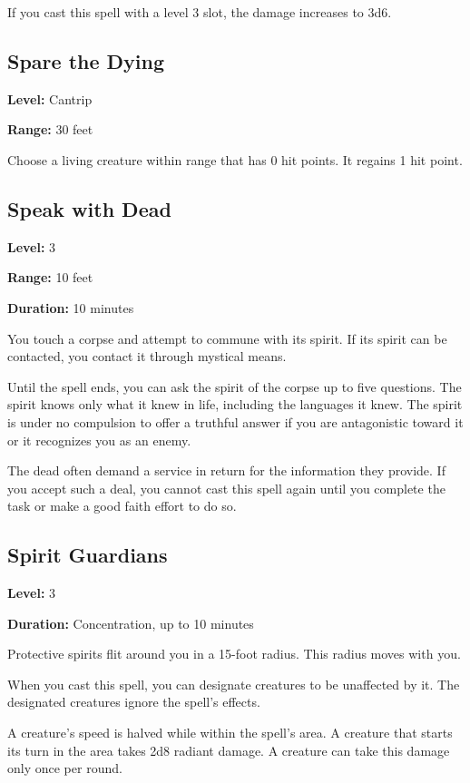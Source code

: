 \documentclass[12pt,letterpaper,twocolumn,openany,nodeprecatedcode,bg=none]{dndbook}
\let\oldsubsection\subsection
\renewcommand{\subsection}[1]{%
  \needspace{5\baselineskip}%
  \oldsubsection{#1}%
}
\begin{document}
If you cast this spell with a level 3 slot, the damage increases to 3d6.

\subsection{Spare the Dying}\label{spare-the-dying}

\textbf{Level:} Cantrip

\textbf{Range:} 30 feet

Choose a living creature within range that has 0 hit points. It regains
1 hit point.

\subsection{Speak with Dead}\label{speak-with-dead}

\textbf{Level:} 3

\textbf{Range:} 10 feet

\textbf{Duration:} 10 minutes

You touch a corpse and attempt to commune with its spirit. If its spirit
can be contacted, you contact it through mystical means.

Until the spell ends, you can ask the spirit of the corpse up to five
questions. The spirit knows only what it knew in life, including the
languages it knew. The spirit is under no compulsion to offer a truthful
answer if you are antagonistic toward it or it recognizes you as an
enemy.

The dead often demand a service in return for the information they
provide. If you accept such a deal, you cannot cast this spell again
until you complete the task or make a good faith effort to do so.

\newpage

\subsection{Spirit Guardians}\label{spirit-guardians}

\textbf{Level:} 3

\textbf{Duration:} Concentration, up to 10 minutes

Protective spirits flit around you in a 15-foot radius. This radius
moves with you.

When you cast this spell, you can designate creatures to be unaffected
by it. The designated creatures ignore the spell's effects.

A creature's speed is halved while within the spell's area. A creature
that starts its turn in the area takes 2d8 radiant damage. A creature
can take this damage only once per round.
\end{document}
